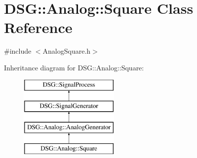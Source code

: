 \hypertarget{classDSG_1_1Analog_1_1Square}{\section{D\-S\-G\-:\-:Analog\-:\-:Square Class Reference}
\label{classDSG_1_1Analog_1_1Square}
}


{\ttfamily \#include $<$Analog\-Square.\-h$>$}

Inheritance diagram for D\-S\-G\-:\-:Analog\-:\-:Square\-:\begin{figure}[H]
\begin{center}
\leavevmode
\includegraphics[height=4.000000cm]{classDSG_1_1Analog_1_1Square}
\end{center}
\end{figure}
